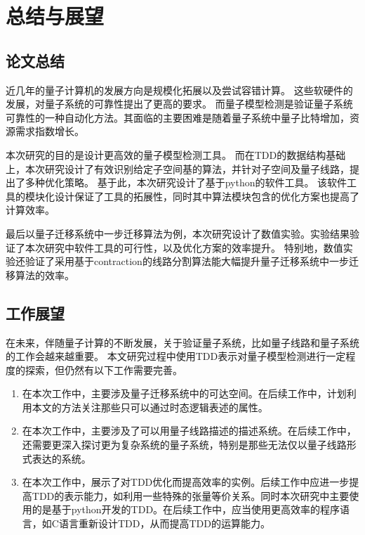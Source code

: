 \chapter{总结与展望}
\section{论文总结}
近几年的量子计算机的发展方向是规模化拓展以及尝试容错计算。
这些软硬件的发展，对量子系统的可靠性提出了更高的要求。
而量子模型检测是验证量子系统可靠性的一种自动化方法。其面临的主要困难是随着量子系统中量子比特增加，资源需求指数增长。

本次研究的目的是设计更高效的量子模型检测工具。
而在TDD的数据结构基础上，本次研究设计了有效识别给定子空间基的算法，并针对子空间及量子线路，提出了多种优化策略。
基于此，本次研究设计了基于python的软件工具。
该软件工具的模块化设计保证了工具的拓展性，同时其中算法模块包含的优化方案也提高了计算效率。

最后以量子迁移系统中一步迁移算法为例，本次研究设计了数值实验。实验结果验证了本次研究中软件工具的可行性，以及优化方案的效率提升。
特别地，数值实验还验证了采用基于contraction的线路分割算法能大幅提升量子迁移系统中一步迁移算法的效率。


\section{工作展望}

在未来，伴随量子计算的不断发展，关于验证量子系统，比如量子线路和量子系统的工作会越来越重要。
本文研究过程中使用TDD表示对量子模型检测进行一定程度的探索，但仍然有以下工作需要完善。
\begin{enumerate}
    \item 在本次工作中，主要涉及量子迁移系统中的可达空间。在后续工作中，计划利用本文的方法关注那些只可以通过时态逻辑表述的属性。
    \item 在本次工作中，主要涉及了可以用量子线路描述的描述系统。在后续工作中，还需要更深入探讨更为复杂系统的量子系统，特别是那些无法仅以量子线路形式表达的系统。
    \item 在本次工作中，展示了对TDD优化而提高效率的实例。后续工作中应进一步提高TDD的表示能力，如利用一些特殊的张量等价关系。同时本次研究中主要使用的是基于python开发的TDD。在后续工作中，应当使用更高效率的程序语言，如C语言重新设计TDD，从而提高TDD的运算能力。
\end{enumerate}


